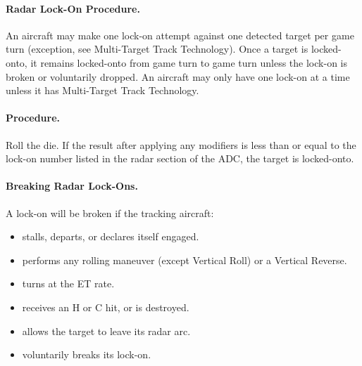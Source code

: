 \paragraph{Radar Lock-On Procedure.} An aircraft may make one lock-on attempt against one detected target per game turn (exception, see Multi-Target Track Technology). Once a target is locked-onto, it remains locked-onto from game turn to game turn unless the lock-on is broken or voluntarily dropped. An aircraft may only have one lock-on at a time unless it has Multi-Target Track Technology.

\paragraph{Procedure.} Roll the die. If the result after applying any modifiers is less than or equal to the lock-on number listed in the radar section of the ADC, the target is locked-onto. 

\paragraph{Breaking Radar Lock-Ons.} A lock-on will be broken if the tracking aircraft:

\begin{itemize}

    \item stalls, departs, or declares itself engaged.

    \item performs any rolling maneuver (except Vertical Roll) or a Vertical Reverse.

    \item turns at the ET rate.

    \item receives an H or C hit, or is destroyed.

    \item allows the target to leave its radar arc.

    \item voluntarily breaks its lock-on.

\end{itemize}

